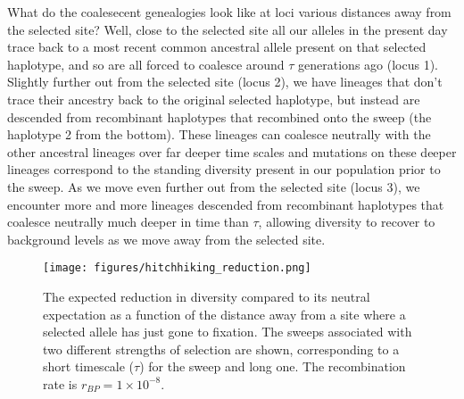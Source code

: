 What do the coalesecent genealogies look like at loci various distances away from the
selected site? Well, close to the selected site all our alleles in the
present day trace back to a most recent common ancestral allele
present on that selected haplotype, and so are all forced to coalesce
around $\tau$ generations ago (locus 1). Slightly further out from the selected
site (locus 2), we have lineages that don't trace their ancestry back
to the original selected haplotype, but instead are descended from
recombinant haplotypes that recombined onto the sweep (the haplotype 2 from the
bottom). These lineages can coalesce neutrally with the other ancestral lineages
over far deeper time scales and mutations on these deeper lineages
correspond to the standing diversity present in our population
prior to the sweep. As we move even further out from the selected site
(locus 3), we encounter more and more lineages descended from
recombinant haplotypes that coalesce neutrally much deeper in time than $\tau$, 
allowing diversity to recover to background levels as we move away
from the selected site.

\begin{figure}
\begin{center}
\texttt{[image: figures/hitchhiking\_reduction.png]}
\end{center}
\caption{The expected reduction in diversity compared to its neutral expectation as
a function of the distance away from a site where a selected allele
has just gone to fixation. The sweeps associated with two different strengths of selection are shown, corresponding to a short timescale ($\tau$) for the sweep and long one. The recombination rate is $r_{BP}= 1\times
10^{-8}$. } \label{fig:hitchhiking_reduction}
\end{figure}



